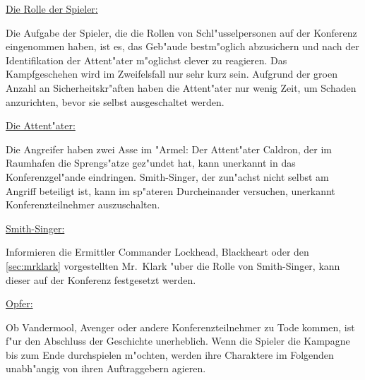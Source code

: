 \begin{remarks}
	\underline{Die Rolle der Spieler:}

	Die Aufgabe der Spieler, die die Rollen von Schl"usselpersonen auf der Konferenz eingenommen haben, ist es, das Geb"aude bestm"oglich abzusichern und nach der Identifikation der Attent"ater m"oglichst clever zu reagieren. Das Kampfgeschehen wird im Zweifelsfall nur sehr kurz sein. Aufgrund der gro\3en Anzahl an Sicherheitskr"aften haben die Attent"ater nur wenig Zeit, um Schaden anzurichten, bevor sie selbst ausgeschaltet werden.

	\underline{Die Attent"ater:}
	
	Die Angreifer haben zwei Asse im "Armel: Der Attent"ater Caldron, der im Raumhafen die Sprengs"atze gez"undet hat, kann unerkannt in das Konferenzgel"ande eindringen. Smith-Singer, der zun"achst nicht selbst am Angriff beteiligt ist, kann im sp"ateren Durcheinander versuchen, unerkannt Konferenzteilnehmer auszuschalten.

	\underline{Smith-Singer:}

	Informieren die Ermittler Commander Lockhead, Blackheart oder den \cref{sec:mrklark} vorgestellten Mr.~Klark "uber die Rolle von Smith-Singer, kann dieser auf der Konferenz festgesetzt werden.

	\underline{Opfer:}
	
	Ob Vandermool, Avenger oder andere Konferenzteilnehmer zu Tode kommen, ist f"ur den Abschluss der Geschichte unerheblich. Wenn die Spieler die Kampagne bis zum Ende durchspielen m"ochten, werden ihre Charaktere im Folgenden unabh"angig von ihren Auftraggebern agieren.
\end{remarks}
